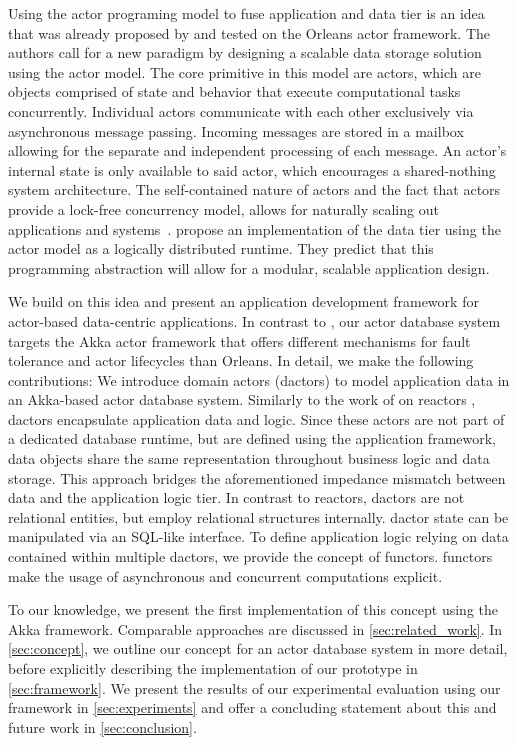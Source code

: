   Using the actor programing model to fuse application and data tier is an idea that was already proposed by \citet{manifesto} and tested on the Orleans actor framework. 
  The authors call for a new paradigm by designing a scalable data storage solution using the actor model.
  The core primitive in this model are actors, which are objects comprised of state and behavior that execute computational tasks concurrently.
  Individual actors communicate with each other exclusively via asynchronous message passing.
  Incoming messages are stored in a mailbox allowing for the separate and independent processing of each message.
  An actor's internal state is only available to said actor, which encourages a shared-nothing system architecture.
  The self-contained nature of actors and the fact that actors provide a lock-free concurrency model, allows for naturally scaling out applications and systems~\cite{vernon2015reactive}.
   propose an implementation of the data tier using the actor model as a logically distributed runtime.
  They predict that this programming abstraction will allow for a modular, scalable application design.


  

  We build on this idea and present an application development framework for actor-based data-centric applications.
  In contrast to \citet{manifesto}, our actor database system targets the Akka actor framework that offers different mechanisms for fault tolerance and actor lifecycles than Orleans.
  In detail, we make the following contributions:
  We introduce domain actors (\glspl{dactor}) to model application data in an Akka-based actor database system.
  Similarly to the work of \citeauthor{Shah:reactdb} on reactors \cite{Shah:reactdb}, \glspl{dactor} encapsulate application data and logic.
  Since these actors are not part of a dedicated database runtime, but are defined using the application framework, data objects share the same representation throughout business logic and data storage.
  This approach bridges the aforementioned impedance mismatch between data and the application logic tier.
  In contrast to reactors, \glspl{dactor} are not relational entities, but employ relational structures internally.
  \Gls{dactor} state can be manipulated via an SQL-like interface.
  To define application logic relying on data contained within multiple \glspl{dactor}, we provide the concept of \glspl{functor}.
  \Glspl{functor} make the usage of asynchronous and concurrent computations explicit. 

  To our knowledge, we present the first implementation of this concept using the Akka framework.
  Comparable approaches are discussed in \cref{sec:related_work}.
  In \cref{sec:concept}, we outline our concept for an actor database system in more detail,
  before explicitly describing the implementation of our prototype in \cref{sec:framework}.
  We present the results of our experimental evaluation using our framework in \cref{sec:experiments} and offer a concluding statement about this and future work in \cref{sec:conclusion}.
  
